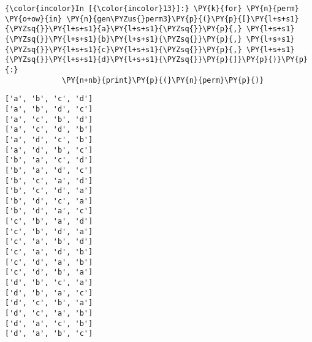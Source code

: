     \begin{Verbatim}[commandchars=\\\{\}]
{\color{incolor}In [{\color{incolor}13}]:} \PY{k}{for} \PY{n}{perm} \PY{o+ow}{in} \PY{n}{gen\PYZus{}perm3}\PY{p}{(}\PY{p}{[}\PY{l+s+s1}{\PYZsq{}}\PY{l+s+s1}{a}\PY{l+s+s1}{\PYZsq{}}\PY{p}{,} \PY{l+s+s1}{\PYZsq{}}\PY{l+s+s1}{b}\PY{l+s+s1}{\PYZsq{}}\PY{p}{,} \PY{l+s+s1}{\PYZsq{}}\PY{l+s+s1}{c}\PY{l+s+s1}{\PYZsq{}}\PY{p}{,} \PY{l+s+s1}{\PYZsq{}}\PY{l+s+s1}{d}\PY{l+s+s1}{\PYZsq{}}\PY{p}{]}\PY{p}{)}\PY{p}{:}
             \PY{n+nb}{print}\PY{p}{(}\PY{n}{perm}\PY{p}{)}
\end{Verbatim}


    \begin{Verbatim}[commandchars=\\\{\}]
['a', 'b', 'c', 'd']
['a', 'b', 'd', 'c']
['a', 'c', 'b', 'd']
['a', 'c', 'd', 'b']
['a', 'd', 'c', 'b']
['a', 'd', 'b', 'c']
['b', 'a', 'c', 'd']
['b', 'a', 'd', 'c']
['b', 'c', 'a', 'd']
['b', 'c', 'd', 'a']
['b', 'd', 'c', 'a']
['b', 'd', 'a', 'c']
['c', 'b', 'a', 'd']
['c', 'b', 'd', 'a']
['c', 'a', 'b', 'd']
['c', 'a', 'd', 'b']
['c', 'd', 'a', 'b']
['c', 'd', 'b', 'a']
['d', 'b', 'c', 'a']
['d', 'b', 'a', 'c']
['d', 'c', 'b', 'a']
['d', 'c', 'a', 'b']
['d', 'a', 'c', 'b']
['d', 'a', 'b', 'c']

    \end{Verbatim}


    
    
    
